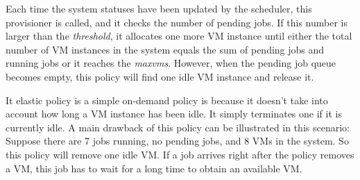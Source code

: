 Each time the system statuses have been updated by the scheduler, this
provisioner is called, and it checks the number of pending jobs. If
this number is larger than the \emph{threshold}, it allocates one more
VM instance until either the total number of VM instances in the
system equals the sum of pending jobs and running jobs or it reaches
the \emph{maxvms}. However, when the pending job queue becomes empty,
this policy will find one idle VM instance and release it.

It elastic policy is a simple on-demand policy is because it doesn't
take into account how long a VM instance has been idle. It simply
terminates one if it is currently idle. A main drawback of this policy
can be illustrated in this scenario: Suppose there are 7 jobs running,
no pending jobs, and 8 VMs in the system. So this policy will remove
one idle VM. If a job arrives right after the policy removes a VM,
this job has to wait for a long time to obtain an available VM.

